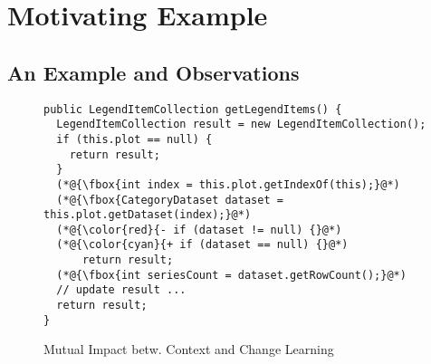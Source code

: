\section{Motivating Example}
\label{motiv:sec}

\subsection{An Example and Observations}

\begin{figure}[t]
	\centering
	\begin{lstlisting}[]
public LegendItemCollection getLegendItems() {
  LegendItemCollection result = new LegendItemCollection();
  if (this.plot == null) {
    return result;
  }
  (*@{\fbox{int index = this.plot.getIndexOf(this);}@*)
  (*@{\fbox{CategoryDataset dataset = this.plot.getDataset(index);}@*)
  (*@{\color{red}{- if (dataset != null) {}@*)
  (*@{\color{cyan}{+ if (dataset == null) {}@*)
      return result;
  (*@{\fbox{int seriesCount = dataset.getRowCount();}@*)
  // update result ...
  return result;
}
	\end{lstlisting}
        \vspace{-14pt}
        \caption{Mutual Impact betw. Context and Change Learning}
        \vspace{-8pt}
        \label{fig:motiv}
\end{figure}


